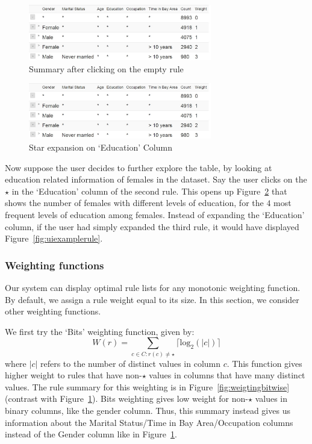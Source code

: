 \documentclass[10pt,journal,compsoc]{IEEEtran}
\begin{document}
\begin{figure}
\centering
\includegraphics[width=80mm,frame]{graphs/screenshots6col/empty_expansion.jpg}
\caption{Summary after clicking on the empty rule \label{fig:uiexample1}}
\vspace{-10pt}
\end{figure} 

\begin{figure}
\centering
\includegraphics[width=80mm,frame]{graphs/screenshots6col/empty_expansion.jpg}
\caption{Star expansion on `Education' Column \label{fig:uiexamplestar}}
\vspace{-10pt}
\end{figure}

Now suppose the user decides to further explore the table, by looking at education related information of females in the dataset. Say the user clicks on the $\star$ in the `Education' column of the second rule. This opens up Figure~\ref{fig:uiexamplestar} that shows the number of females with different levels of education, for the $4$ most frequent levels of education among females. Instead of expanding the `Education' column, if the user had simply expanded the third rule, it would have displayed Figure~\ref{fig:uiexamplerule}. 

\subsubsection{Weighting functions}
Our system can display optimal rule lists for any monotonic weighting function. By default, we assign a rule weight equal to its size. In this section, we consider other weighting functions. 

We first try the `Bits' weighting function, given by:
$$W(r) = \sum_{c \in C : r(c) \neq \star} \lceil \text{log}_2(|c|) \rceil$$ where $|c|$ refers to the number of distinct values in column $c$. This function gives higher weight to rules that have non-$\star$ values in columns that have many distinct values. The rule summary for this weighting is in Figure~\ref{fig:weigtingbitwise} (contrast with Figure~\ref{fig:uiexample1}). Bits weighting gives low weight for non-$\star$ values in binary columns, like the gender column. Thus, this summary instead gives us information about the Marital Status/Time in Bay Area/Occupation columns instead of the Gender column like in Figure~\ref{fig:uiexample1}.  
\end{document}
